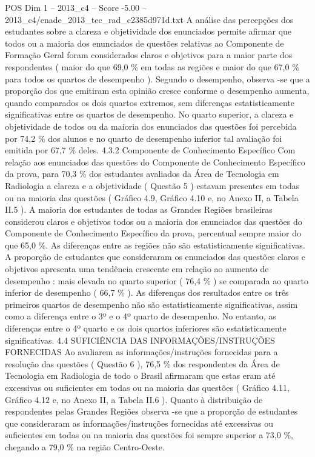 \begin{textsample}{POS Dim 1 – 2013\_c4 – Score -5.00 – 2013\_c4/enade\_2013\_tec\_rad\_c2385d971d.txt}
A análise das percepções dos estudantes sobre a clareza e objetividade dos enunciados permite afirmar que todos ou a maioria dos enunciados de questões relativas ao Componente de Formação Geral foram considerados claros e objetivos para a maior parte dos respondentes ( maior do que 69,0 \% em todas as regiões e maior do que 67,0 \% para todos os quartos de desempenho ).
Segundo o desempenho, observa -se que a proporção dos que emitiram esta opinião cresce conforme o desempenho aumenta, quando comparados os dois quartos extremos, sem diferenças estatisticamente significativas entre os quartos de desempenho.
No quarto superior, a clareza e objetividade de todos ou da maioria dos enunciados das questões foi percebida por 74,2 \% dos alunos e no quarto de desempenho inferior tal avaliação foi emitida por 67,7 \% deles. 4.3.2 Componente de Conhecimento Específico Com relação aos enunciados das questões do Componente de Conhecimento Específico da prova, para 70,3 \% dos estudantes avaliados da Área de Tecnologia em Radiologia a clareza e a objetividade ( Questão 5 ) estavam presentes em todas ou na maioria das questões ( Gráfico 4.9, Gráfico 4.10 e, no Anexo II, a Tabela II.5 ).
A maioria dos estudantes de todas as Grandes Regiões brasileiras considerou claros e objetivos todos ou a maioria dos enunciados das questões do Componente de Conhecimento Específico da prova, percentual sempre maior do que 65,0 \%.
As diferenças entre as regiões não são estatisticamente significativas.
A proporção de estudantes que consideraram os enunciados das questões claros e objetivos apresenta uma tendência crescente em relação ao aumento de desempenho : mais elevada no quarto superior ( 76,4 \% ) se comparada ao quarto inferior de desempenho ( 66,7 \% ).
As diferenças dos resultados entre os três primeiros quartos de desempenho não são estatisticamente significativas, assim como a diferença entre o 3º e o 4º quarto de desempenho.
No entanto, as diferenças entre o 4º quarto e os dois quartos inferiores são estatisticamente significativas. 4.4 SUFICIÊNCIA DAS INFORMAÇÕES/INSTRUÇÕES FORNECIDAS Ao avaliarem as informações/instruções fornecidas para a resolução das questões ( Questão 6 ), 76,5 \% dos respondentes da Área de Tecnologia em Radiologia de todo o Brasil afirmaram que estas eram até excessivas ou suficientes em todas ou na maioria das questões ( Gráfico 4.11, Gráfico 4.12 e, no Anexo II, a Tabela II.6 ).
Quanto à distribuição de respondentes pelas Grandes Regiões observa -se que a proporção de estudantes que consideraram as informações/instruções fornecidas até excessivas ou suficientes em todas ou na maioria das questões foi sempre superior a 73,0 \%, chegando a 79,0 \% na região Centro-Oeste.

\end{textsample}
